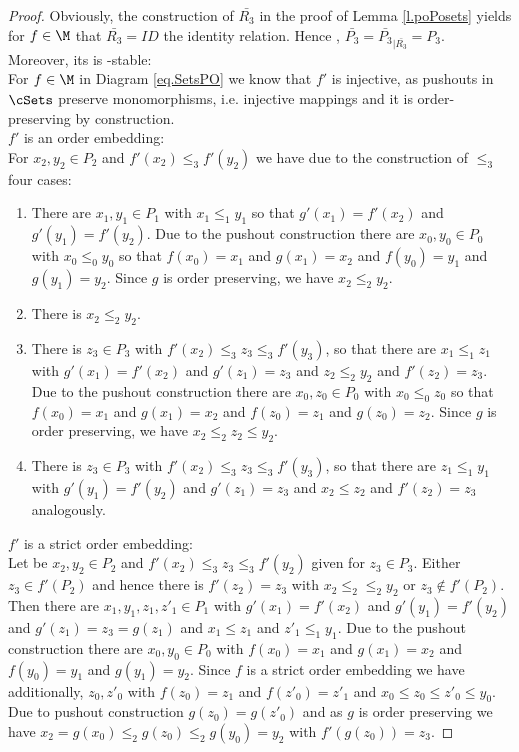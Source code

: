 \begin{proof}
Obviously, the construction of $\bar{R_3}$ in the proof of Lemma \ref{l.poPosets} yields for $f \in \M$ that 
$\bar{R_3} =ID$ the identity relation. Hence , $\bar{P_3}= \bar{P_3}_{\mid \bar{R_3}}=P_3$.\\
Moreover, its is \M-stable:\\
For $f \in \M$ in Diagram \ref{eq.SetsPO} we know that $f'$ is injective, as pushouts in $\cSets$ preserve monomorphisms, i.e. injective mappings and it is order-preserving by construction. \\
$f'$ is an order embedding: \\
For $x_2, y_2 \in P_2$ and $f'(x_2) \le_3 f'(y_2)$ we have due to the construction of $\le_3$ four cases:

\begin{enumerate}
	\item There are $x_1,  y_1 \in P_1$ with $x_1 \le_1 y_1$ so that $g'(x_1) = f'(x_2)$ and $g'(y_1) = f'(y_2)$.
	      Due to the pushout construction there are  $x_0,  y_0 \in P_0$ with $x_0 \le_0 y_0$ 
				  so that $f(x_0) = x_1$ and $g(x_1) = x_2$ and  $f(y_0) = y_1$ and $g(y_1) = y_2$. Since $g$ is order preserving, we have $x_2 \le_2 y_2$.\\					
	\item There is $x_2 \le_2 y_2$.\\
	\item There is $z_3 \in P_3$ with $f'(x_2) \le_3 z_3 \le_3 f'(y_3)$, so that there are $x_1 \le_1 z_1$ with
	      $g'(x_1) = f'(x_2)$  and $g'(z_1) = z_3$ and $z_2 \le_2 y_2$ and $f'(z_2) =z_3$.\\
				Due to the pushout construction there are  $x_0,  z_0 \in P_0$ with $x_0 \le_0 z_0$ 
				  so that $f(x_0) = x_1$ and $g(x_1) = x_2$ and  $f(z_0) = z_1$ and $g(z_0) =z_2$.  Since $g$ is order preserving, we have $x_2 \le_2 z_2 \le y_2$.\\	
	\item There is $z_3 \in P_3$ with $f'(x_2) \le_3 z_3 \le_3 f'(y_3)$, so that there are $ z_1 \le_1 y_1$ with
	      $g'(y_1) = f'(y_2)$  and $g'(z_1) = z_3$ and $x_2 \le z_2$ and $f'(z_2) =z_3$ analogously.	
\end{enumerate}
$f'$ is a strict order embedding:\\ 
Let be  $x_2, y_2 \in P_2$ and $f'(x_2) \le_3 z_3 \le_3 f'(y_2)$ given for $z_3 \in P_3$.
Either $z_3 \in f'(P_2)$ and hence there is $f'(z_2)=z_3$ with $x_2 \le_2 \le_2 y_2$ or $z_3 \not \in f'(P_2)$.
Then there are $x_1,y_1, z_1,z'_1 \in P_1$ with $g'(x_1) = f'(x_2)$ and $g'(y_1) = f'(y_2)$ and  $g'(z_1) = z_3 = g(z_1)$ and $x_1 \le z_1$ and $z'_1 \le_1 y_1$. Due to the pushout construction there are  $x_0,  y_0 \in P_0$ with  $f(x_0) = x_1$ and $g(x_1) = x_2$ and  $f(y_0) = y_1$ and $g(y_1) = y_2$. Since $f$ is a strict order embedding we have 
additionally, $z_0,z'_0$ with $f(z_0) = z_1$ and $f(z'_0) = z'_1$ and $x_0 \le z_0 \le z'_0 \le y_0$. Due to pushout construction $g(z_0) = g(z'_0)$ and as $g$ is order preserving we have $x_2 = g(x_0) \le _2 g(z_0) \le_2 g(y_0) = y_2$
with $f'(g(z_0)) = z_3$.
\end{proof}

